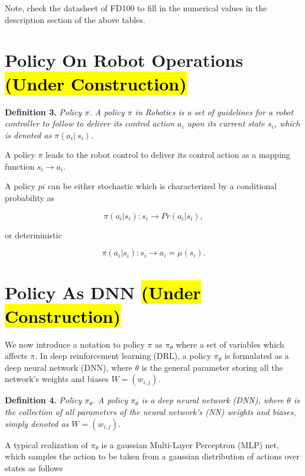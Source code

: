 \documentclass[conference]{IEEEtran}
\begin{document}
Note, check the datasheet of FD100 to fill in the numerical values in 
the description section of the above tables. 

\section{Policy On Robot Operations \hl{(Under Construction)}}
 
\textbf{Definition 3.} 
\textit{Policy $\pi$.
A policy $\pi$ in Robotics is a set of guidelines for 
a robot controller to follow to deliver its control action $a_i$ upon its 
current state $s_i$, which is denoted as $\pi (a_i |\ s_i)$. 
} 
  
A policy $\pi$ leads to the robot control to deliver
its control action as a mapping function $s_i \rightarrow a_i$. 

A policy $pi$ can be either stochastic which is characterized by a 
conditional probability as

\begin{equation}
\pi(a_i | s_i) : s_i \rightarrow Pr(a_i | s_i), 
\end{equation} 

or deterministic  

\begin{equation}
\pi(a_i | s_i) : s_i \rightarrow a_i = \mu (s_i).  
\end{equation} 

\section{Policy As DNN \hl{(Under Construction)}}

We now introduce a notation to policy $\pi$ as 
$\pi_{\theta}$ where a set of variables which affects $\pi .$
In deep reinforcement learning (DRL), a policy 
$\pi_{\theta}$ 
is formulated as a deep neural network
(DNN), where $\theta$ is the general parameter storing
all the network’s weights and biases $W=(w_{i,j})$.

\textbf{Definition 4.} 
\textit{Policy $\pi_{\theta}$.    
A policy $\pi_{\theta}$ is a deep neural network
(DNN), where $\theta$ is the collection of all parameters  
of the neural network’s (NN) weights and biases, simply 
denoted as $W=(w_{i,j})$. 
} 
 
A typical realization of $\pi_{\theta}$ is a
gaussian Multi-Layer Perceptron (MLP) net, which samples
the action to be taken from a gaussian distribution of actions
over states as follows 
\end{document}
